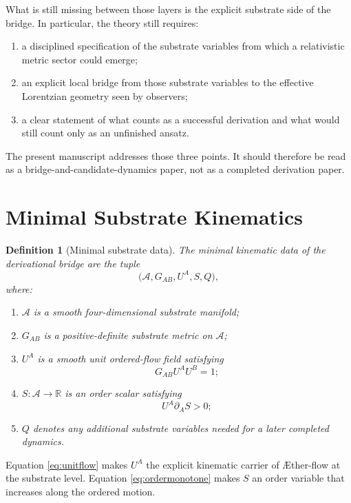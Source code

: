 \documentclass[11pt]{article}
\newcommand{\Aflow}{\AE{}ther-flow}
\newcommand{\Sub}{\mathcal{A}}
\newtheorem{definition}{Definition}
\begin{document}
What is still missing between those layers is the explicit substrate side of the bridge. In particular, the theory still requires:
\begin{enumerate}
    \item a disciplined specification of the substrate variables from which a relativistic metric sector could emerge;
    \item an explicit local bridge from those substrate variables to the effective Lorentzian geometry seen by observers;
    \item a clear statement of what counts as a successful derivation and what would still count only as an unfinished ansatz.
\end{enumerate}

The present manuscript addresses those three points. It should therefore be read as a bridge-and-candidate-dynamics paper, not as a completed derivation paper.

\section{Minimal Substrate Kinematics}

\begin{definition}[Minimal substrate data]
The minimal kinematic data of the derivational bridge are the tuple
\[
\bigl(\Sub, G_{AB}, U^A, S, Q\bigr),
\]
where:
\begin{enumerate}
    \item \(\Sub\) is a smooth four-dimensional substrate manifold;
    \item \(G_{AB}\) is a positive-definite substrate metric on \(\Sub\);
    \item \(U^A\) is a smooth unit ordered-flow field satisfying
    \begin{equation}
    G_{AB} U^A U^B = 1;
    \label{eq:unitflow}
    \end{equation}
    \item \(S:\Sub \to \mathbb{R}\) is an order scalar satisfying
    \begin{equation}
    U^A \partial_A S > 0;
    \label{eq:ordermonotone}
    \end{equation}
    \item \(Q\) denotes any additional substrate variables needed for a later completed dynamics.
\end{enumerate}
\end{definition}

Equation \eqref{eq:unitflow} makes \(U^A\) the explicit kinematic carrier of \Aflow{} at the substrate level. Equation \eqref{eq:ordermonotone} makes \(S\) an order variable that increases along the ordered motion.
\end{document}
